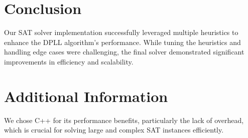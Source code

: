 \documentclass[titlepage]{article}
\begin{document}
\section*{Conclusion}
Our SAT solver implementation successfully leveraged multiple heuristics to enhance the DPLL algorithm's performance. While tuning the heuristics and handling edge cases were challenging, the final solver demonstrated significant improvements in efficiency and scalability.

\section*{Additional Information}
We chose C++ for its performance benefits, particularly the lack of overhead, which is crucial for solving large and complex SAT instances efficiently.
\end{document}
